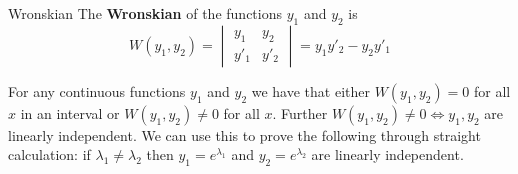 \documentclass[letterpaper, 11pt, openany]{book}
\theoremstyle{mytheoremstyle}
\theoremstyle{myexamplestyle}
\begin{document}
\begin{definition}{}{Wronskian}
    The \textbf{Wronskian} of the functions \(y_{1}\) and \(y_2\) is
    \[
        W(y_{1}, y_{2}) = \begin{vmatrix}
        y_{1} & y_{2}\\
        y'_{1} & y'_{2}
    \end{vmatrix} = y_{1} y'_{2} - y_{2} y'_{1}
    \]
\end{definition}

For any continuous functions \(y_{1}\) and \(y_2\) we have that either \(W(y_{1}, y_{2}) = 0\) for all \(x\) in an interval or \(W(y_{1}, y_{2}) \neq 0\) for all \(x\). Further \(W(y_{1}, y_{2}) \neq 0 \Leftrightarrow y_{1}, y_{2}\) are linearly independent. We can use this to prove the following through straight calculation: if \(\lambda_{1} \neq \lambda_{2}\) then \(y_{1} = e^{\lambda_{1}}\) and \(y_{2} = e^{\lambda_{2}}\) are linearly independent.
\end{document}
